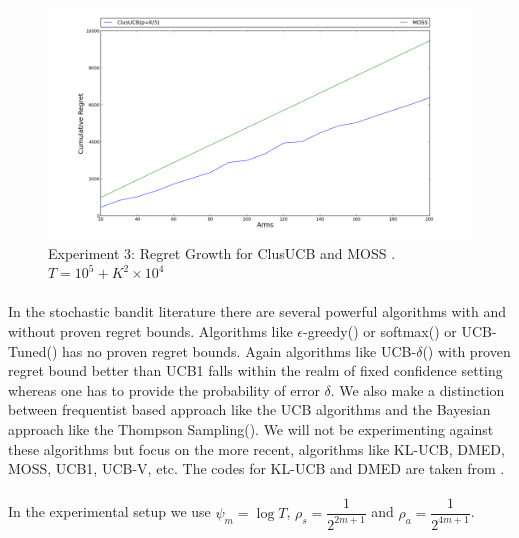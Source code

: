 \hspace{0.1em}

\begin{figure}[!tbp]
\label{fig:3}
\begin{minipage}[b]{0.5\textwidth}
\includegraphics[width=\textwidth]{img/clUCB_MOSS_expt3.png}
\caption{Experiment 3: Regret Growth for ClusUCB and MOSS . $T=10^{5} + K^{2}\times 10^{4}$}
\end{minipage}
\end{figure}

\hspace{0.1em}



\paragraph{}In the stochastic bandit literature there are several powerful algorithms with and without proven regret bounds. Algorithms like $\epsilon$-greedy(\cite{sutton1998reinforcement}) or softmax(\cite{sutton1998reinforcement}) or UCB-Tuned(\cite{auer2002finite}) has no proven regret bounds. Again algorithms like UCB-$\delta$(\cite{abbasi2011improved}) with proven regret bound better than UCB1  falls within the realm of fixed confidence setting whereas one has to provide the probability of error $\delta$. We also make a distinction between frequentist based approach like the UCB algorithms and the Bayesian approach like the Thompson Sampling(\cite{agrawal2011analysis}). We will not be experimenting against these algorithms but focus on the more recent, algorithms like KL-UCB, DMED, MOSS, UCB1, UCB-V, etc. The codes for KL-UCB and DMED are taken from \cite{CapGarKau12}.

\paragraph{}In the experimental setup we use $\psi_{m}=\log T$, $\rho_{s}=\dfrac{1}{2^{2m+1}}$ and $\rho_{a}=\dfrac{1}{2^{4m+1}}$.

